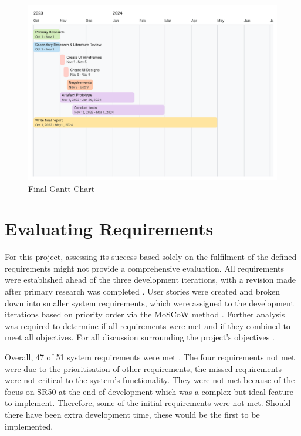 \begin{figure}[h!]
    \centering
    \includegraphics[width=1\linewidth]{figures/Actual FYP Gantt.pdf}
    \caption{Final Gantt Chart}
    \label{fig:final-gantt}
\end{figure}

\clearpage
\section{Evaluating Requirements}
\label{evaluation:requirements}

For this project, assessing its success based solely on the fulfilment of the defined requirements might not provide a comprehensive evaluation. All requirements were established ahead of the three development iterations, with a revision made after primary research was completed . User stories were created and broken down into smaller system requirements, which were assigned to the development iterations based on priority order via the MoSCoW method . Further analysis was required to determine if all requirements were met and if they combined to meet all objectives. For all discussion surrounding the project's objectives .

Overall, 47 of 51 system requirements were met . The four requirements not met were due to the prioritisation of other requirements, the missed requirements were not critical to the system's functionality. They were not met because of the focus on \hyperref[SR:50]{SR50} at the end of development which was a complex but ideal feature to implement. Therefore, some of the initial requirements were not met. Should there have been extra development time, these would be the first to be implemented.

